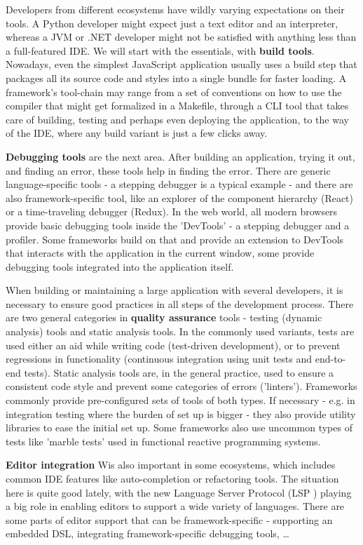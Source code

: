 \documentclass[english,odsaz]{fitthesis}
\begin{document}
Developers from different ecosystems have wildly varying expectations on their
tools. A Python developer might expect just a text editor and an interpreter,
whereas a JVM or .NET developer might not be satisfied with anything less than a
full-featured IDE. We will start with the essentials, with \textbf{build
tools}. Nowadays, even the simplest JavaScript application usually uses a build
step that packages all its source code and styles into a single bundle for
faster loading. A framework's tool-chain may range from a set of conventions on
how to use the compiler that might get formalized in a Makefile, through a CLI
tool that takes care of building, testing and perhaps even deploying the
application, to the way of the IDE, where any build variant is just a few clicks
away.

\textbf{Debugging tools} are the next area. After building an application, trying it out,
and finding an error, these tools help in finding the error. There are generic
language-specific tools - a stepping debugger is a typical example - and there
are also framework-specific tool, like an explorer of the component hierarchy
(React) or a time-traveling debugger (Redux). In the web world, all modern
browsers provide basic debugging tools inside the 'DevTools' - a stepping
debugger and a profiler. Some frameworks build on that and provide an extension
to DevTools that interacts with the application in the current window, some
provide debugging tools integrated into the application itself.

When building or maintaining a large application with several developers, it is
necessary to ensure good practices in all steps of the development
process. There are two general categories in \textbf{quality assurance} tools - testing
(dynamic analysis) tools and static analysis tools. In the commonly used
variants, tests are used either an aid while writing code (test-driven
development), or to prevent regressions in functionality (continuous integration
using unit tests and end-to-end tests). Static analysis tools are, in the
general practice, used to ensure a consistent code style and prevent some
categories of errors ('linters'). Frameworks commonly provide pre-configured
sets of tools of both types. If necessary - e.g. in integration testing where
the burden of set up is bigger - they also provide utility libraries to ease the
initial set up. Some frameworks also use uncommon types of tests like 'marble
tests' used in functional reactive programming systems.

\textbf{Editor integration} Wis also important in some ecosystems, which includes common
IDE features like auto-completion or refactoring tools. The situation here is
quite good lately, with the new Language Server Protocol (LSP \cite{lsp}) playing a big
role in enabling editors to support a wide variety of languages. There are some
parts of editor support that can be framework-specific - supporting an embedded
DSL, integrating framework-specific debugging tools, \ldots{}
\end{document}
